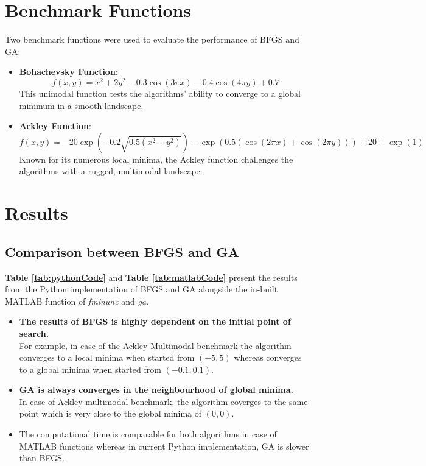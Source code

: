 \documentclass[12pt,a4paper,oneside]{paper} %
\begin{document}
\section{Benchmark Functions}

Two benchmark functions were used to evaluate the performance of BFGS and GA:

\begin{itemize}
    \item \textbf{Bohachevsky Function}: 
    \[
    f(x, y) = x^2 + 2y^2 - 0.3\cos(3\pi x) - 0.4\cos(4\pi y) + 0.7
    \]
    This unimodal function tests the algorithms' ability to converge to a global minimum in a smooth landscape.

    \item \textbf{Ackley Function}:
    \[
    f(x, y) = -20 \exp\left(-0.2 \sqrt{0.5(x^2 + y^2)}\right) - \exp\left(0.5(\cos(2\pi x) + \cos(2\pi y))\right) + 20 + \exp(1)
    \]
    Known for its numerous local minima, the Ackley function challenges the algorithms with a rugged, multimodal landscape.
\end{itemize}

\section{Results}

\subsection{Comparison between BFGS and GA}
\textbf{Table \ref{tab:pythonCode}} and \textbf{Table \ref{tab:matlabCode}} present the results from the Python implementation of BFGS and GA alongside the in-built MATLAB function of \emph{fminunc} and \emph{ga}. 
\begin{itemize}
    \item \textbf{The results of BFGS is highly dependent on the initial point of search.}\\
    For example, in case of the Ackley Multimodal benchmark the algorithm converges to a local minima when started from $(-5,5)$ whereas converges to a global minima when started from $(-0.1, 0.1)$.
    \item \textbf{GA is always converges in the neighbourhood of global minima.}\\
    In case of Ackley multimodal benchmark, the algorithm coverges to the same point which is very close to the global minima of $(0,0)$.
    \item The computational time is comparable for both algorithms in case of MATLAB functions whereas in current Python implementation, GA is slower than BFGS.
\end{itemize}
\end{document}
